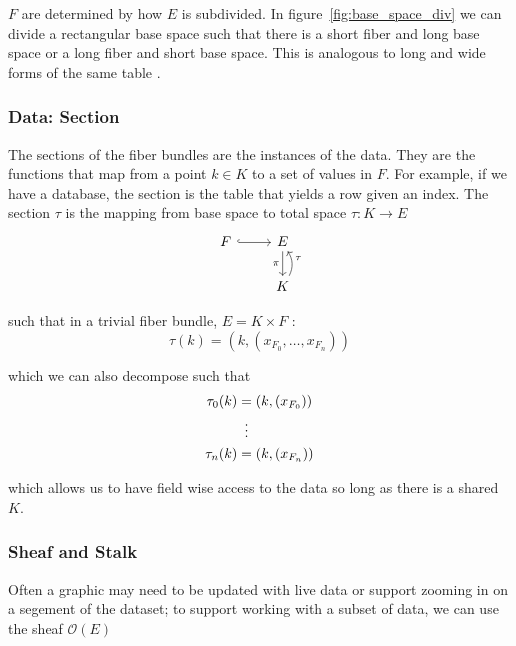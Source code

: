 \documentclass[../main.tex]{subfiles}
\begin{document}
$F$ are determined by how $E$ is subdivided\cite{QuotientSpaceTopology2020,QuotientSpaceTopology2020}. In figure~\ref{fig:base_space_div} we can divide a rectangular base space such that there is a short fiber and long base space or a long fiber and short base space. This is analogous to long and wide forms of the same table \cite{wickham2014tidy}.

\subsubsection{Data: Section}
\label{sec:section_data}
The sections of the fiber bundles are the instances of the data. They are the functions that map from a point $k \in K$ to a set of values in $F$. For example, if we have a database, the section is the table that yields a row given an index. The section $\tau$ is the mapping from base space to total space $\tau: K\rightarrow E$ 
\begin{equation}
    \label{eq:section}
    \begin{tikzcd}
        F \arrow[r, hook] & E \arrow[d, "\pi"']           \\
        & K \arrow[u, "\tau"', bend right]
    \end{tikzcd}
\end{equation}

such that in a trivial fiber bundle, $E = K \times F$ \cite{rowlandFiberBundle,FiberBundle2020}:
\begin{equation}
    \label{eq:section_return}
    \tau(k) = (k, (x_{F_{0}}, \ldots, x_{F_{n}}))
\end{equation}

which we can also decompose such that
\begin{align}
\tau_{0}(k) &= (k, (x_{F_{0}}))\\
            & \vdotswithin{=}\\
\tau_{n}(k) &= (k, (x_{F_{n}}))
\end{align}

which allows us to have field wise access to the data so long as there is a shared $K$.  

\subsubsection{Sheaf and Stalk}
\label{sec:sheaf_stalk}
Often a graphic may need to be updated with live data or support zooming in on a segement of the dataset; to support working with a subset of data, we can use the sheaf $\mathcal{O}(E)$
\end{document}
